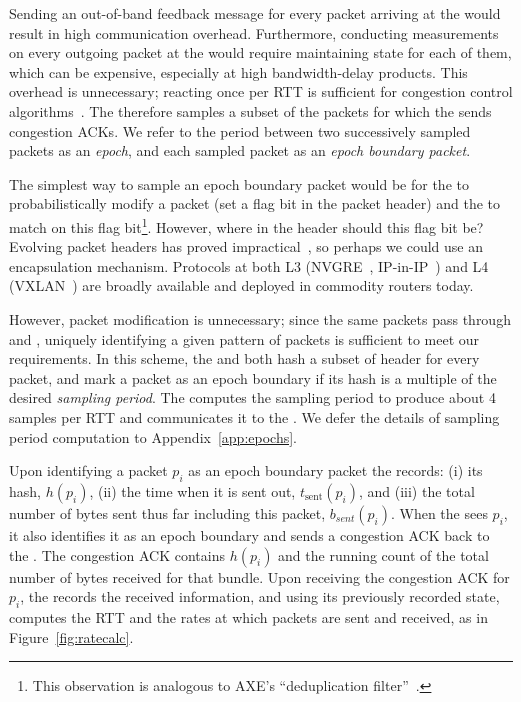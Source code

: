 Sending an out-of-band feedback message for every packet arriving at the \outbox would result in high communication overhead. 
Furthermore, conducting measurements on every outgoing packet at the \inbox would require maintaining state for each of them, which can be expensive, especially at high bandwidth-delay products. 
This overhead is unnecessary; reacting once per RTT is sufficient for congestion control algorithms~\cite{ccp}. 
The \inbox therefore samples a subset of the packets for which the \outbox sends congestion ACKs.
We refer to the period between two successively sampled packets as an \emph{epoch}, and each sampled packet as an \emph{epoch boundary packet}.

The simplest way to sample an epoch boundary packet would be for the \inbox to probabilistically modify a packet (\ie set a flag bit in the packet header) and the \outbox to match on this flag bit\footnote{This observation is analogous to AXE's ``deduplication filter''~\cite{axe}.}.
However, where in the header should this flag bit be?
Evolving packet headers has proved impractical~\cite{trotsky}, so perhaps we could use an encapsulation mechanism.
Protocols at both L3 (\eg NVGRE~\cite{nvgre}, IP-in-IP~\cite{ipinip}) and L4 (\eg VXLAN~\cite{vxlan}) are broadly available and deployed in commodity routers today.

However, packet modification is unnecessary; since the same packets pass through \inbox and \outbox, uniquely identifying a given pattern of packets is sufficient to meet our requirements. In this scheme, the \inbox and \outbox both hash a subset of header for every packet, and mark a packet as an epoch boundary if its hash is a multiple of the desired \emph{sampling period}. The \inbox computes the sampling period to produce about 4 samples per RTT and communicates it to the \outbox. We defer the details of sampling period computation to Appendix~\ref{app:epochs}. 

Upon identifying a packet $p_i$ as an epoch boundary packet the \inbox records: 
(i) its hash, $h(p_i)$, 
(ii) the time when it is sent out, $t_{\text{sent}}(p_i)$, 
and (iii) the total number of bytes sent thus far including this packet, $b_{sent}(p_i)$. 
When the \outbox sees $p_i$, it also identifies it as an epoch boundary and sends a congestion ACK back to the \inbox. 
The congestion ACK contains $h(p_i)$ and the running count of the total number of bytes received for that bundle. 
Upon receiving the congestion ACK for $p_i$, the \inbox records the received information, and using its previously recorded state, computes the RTT and the rates at which packets are sent and received, as in Figure~\ref{fig:ratecalc}. 

